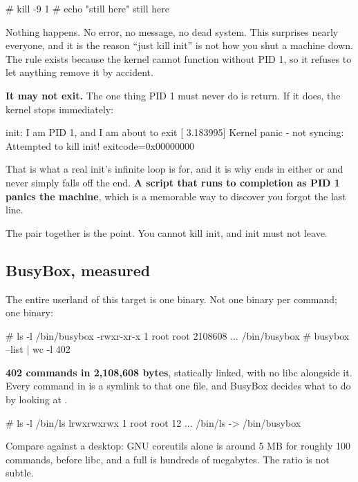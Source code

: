 \begin{console}
# kill -9 1
# echo "still here"
still here
\end{console}

\noindent Nothing happens. No error, no message, no dead system. This surprises nearly everyone, and
it is the reason ``just kill init'' is not how you shut a machine down. The rule exists because the
kernel cannot function without PID 1, so it refuses to let anything remove it by accident.

\textbf{It may not exit.} The one thing PID 1 must never do is return. If it does, the kernel stops
immediately:

\begin{console}
init: I am PID 1, and I am about to exit
[    3.183995] Kernel panic - not syncing: Attempted to kill init! exitcode=0x00000000
\end{console}

\noindent That is what a real init's infinite loop is for, and it is why 
ends in either  or  and never simply falls off the end.
\textbf{A script that runs to completion as PID 1 panics the machine}, which is a memorable way to
discover you forgot the last line.

The pair together is the point. You cannot kill init, and init must not leave.

\subsection{BusyBox, measured}
\label{c2:app:a8}

The entire userland of this target is one binary. Not one binary per command; one binary:

\begin{console}
# ls -l /bin/busybox
-rwxr-xr-x    1 root     root       2108608 ... /bin/busybox
# busybox --list | wc -l
402
\end{console}

\noindent \textbf{402 commands in 2,108,608 bytes}, statically linked, with no libc alongside it.
Every command in  is a symlink to that one file, and BusyBox decides what to do by
looking at .

\begin{console}
# ls -l /bin/ls
lrwxrwxrwx    1 root     root            12 ... /bin/ls -> /bin/busybox
\end{console}

\noindent Compare against a desktop: GNU coreutils alone is around 5 MB for roughly 100 commands,
before libc, and a full  is hundreds of megabytes. The ratio is not subtle.

